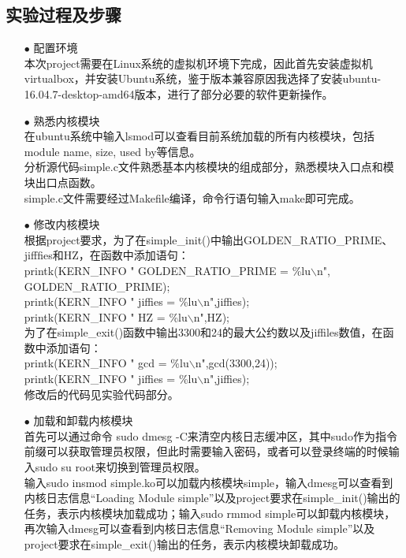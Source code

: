 \documentclass{article}
\begin{document}
\subsection{实验过程及步骤}
\begin{itemize}
\item[$\bullet$]配置环境\\
本次project需要在Linux系统的虚拟机环境下完成，因此首先安装虚拟机virtualbox，并安装Ubuntu系统，鉴于版本兼容原因我选择了安装ubuntu-16.04.7-desktop-amd64版本，进行了部分必要的软件更新操作。
\item[$\bullet$]熟悉内核模块\\
在ubuntu系统中输入lsmod可以查看目前系统加载的所有内核模块，包括module name, size, used by等信息。\\
分析源代码simple.c文件熟悉基本内核模块的组成部分，熟悉模块入口点和模块出口点函数。\\
simple.c文件需要经过Makefile编译，命令行语句输入make即可完成。
\item[$\bullet$]修改内核模块\\
根据project要求，为了在simple\_init()中输出GOLDEN\_RATIO\_PRIME、jifffies和HZ，在函数中添加语句：\\
	printk(KERN\_INFO "  GOLDEN\_RATIO\_PRIME = \%lu$\backslash$n", GOLDEN\_RATIO\_PRIME);\\
	printk(KERN\_INFO "  jiffies = \%lu$\backslash$n",jiffies);\\
	printk(KERN\_INFO "  HZ = \%lu$\backslash$n",HZ);\\
为了在simple\_exit()函数中输出3300和24的最大公约数以及jiffiles数值，在函数中添加语句：\\
	printk(KERN\_INFO "  gcd = \%lu$\backslash$n",gcd(3300,24));\\
	printk(KERN\_INFO "  jiffies = \%lu$\backslash$n",jiffies);\\
修改后的代码见实验代码部分。
\item[$\bullet$]加载和卸载内核模块\\
首先可以通过命令 sudo dmesg -C来清空内核日志缓冲区，其中sudo作为指令前缀可以获取管理员权限，但此时需要输入密码，或者可以登录终端的时候输入sudo su root来切换到管理员权限。\\
输入sudo insmod simple.ko可以加载内核模块simple，输入dmesg可以查看到内核日志信息“Loading Module simple”以及project要求在simple\_init()输出的任务，表示内核模块加载成功；输入sudo rmmod simple可以卸载内核模块，再次输入dmesg可以查看到内核日志信息“Removing Module simple”以及project要求在simple\_exit()输出的任务，表示内核模块卸载成功。\\

\end{itemize}
\end{document}
